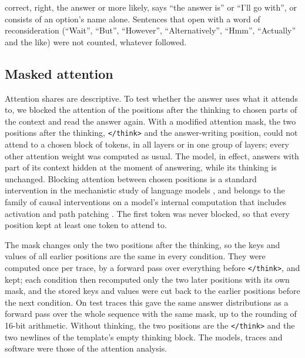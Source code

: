 \documentclass[11pt]{article}
\begin{document}
correct, right, the answer or more likely, says ``the answer is'' or ``I'll go with'', or consists of an option's name alone. Sentences that open with a word of reconsideration (``Wait'', ``But'', ``However'', ``Alternatively'', ``Hmm'', ``Actually'' and the like) were not counted, whatever followed.

\subsection{Masked attention}
\label{sec:ablation}

Attention shares are descriptive. To test whether the answer uses what it attends to, we blocked the attention of the positions after the thinking to chosen parts of the context and read the answer again. With a modified attention mask, the two positions after the thinking, \texttt{</think>} and the answer-writing position, could not attend to a chosen block of tokens, in all layers or in one group of layers; every other attention weight was computed as usual. The model, in effect, answers with part of its context hidden at the moment of answering, while its thinking is unchanged. Blocking attention between chosen positions is a standard intervention in the mechanistic study of language models \citep{geva2023dissecting}, and belongs to the family of causal interventions on a model's internal computation that includes activation and path patching \citep{meng2022locating,wang2023interpretability}. The first token was never blocked, so that every position kept at least one token to attend to.

The mask changes only the two positions after the thinking, so the keys and values of all earlier positions are the same in every condition. They were computed once per trace, by a forward pass over everything before \texttt{</think>}, and kept; each condition then recomputed only the two later positions with its own mask, and the stored keys and values were cut back to the earlier positions before the next condition. On test traces this gave the same answer distributions as a forward pass over the whole sequence with the same mask, up to the rounding of 16-bit arithmetic. Without thinking, the two positions are the \texttt{</think>} and the two newlines of the template's empty thinking block. The models, traces and software were those of the attention analysis.
\end{document}
